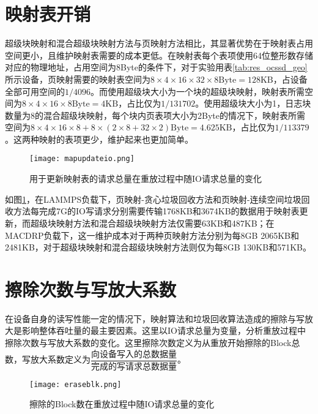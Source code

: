 \section{映射表开销}

超级块映射和混合超级块映射方法与页映射方法相比，其显著优势在于映射表占用空间更小，且维护映射表需要的成本更低。在映射表每个表项使用64位整形数存储对应的物理地址，占用空间为8Byte的条件下，对于实验用表\ref{tab:res_ocssd_geo}所示设备，页映射需要的映射表空间为$8\times 4\times 16\times 32\times 8\mathrm{Byte}=128\mathrm{KB}$，占设备全部可用空间的$1/4096$。而使用超级块大小为一个块的超级块映射，映射表所需空间为$8\times 4\times 16\times 8\mathrm{Byte}=4\mathrm{KB}$，占比仅为$1/131702$。使用超级块大小为1，日志块数量为8的混合超级块映射，每个块内页表项大小为2Byte的情况下，映射表所需空间为$8\times 4\times 16\times 8 + 8\times (2\times 8 + 32\times 2)\mathrm{Byte} = 4.625\mathrm{KB}$，占比仅为$1/113379$。这两种映射的表项更少，维护起来也更加简单。

\begin{figure}[H]
    \centering
    \texttt{[image: mapupdateio.png]}
    \caption{用于更新映射表的请求总量在重放过程中随IO请求总量的变化}
    \label{fig:res_mapupdate}
\end{figure}

如图\ref{fig:res_mapupdate}，在LAMMPS负载下，页映射-贪心垃圾回收方法和页映射-连续空间垃圾回收方法每完成7G的IO写请求分别需要传输1768KB和3674KB的数据用于映射表更新，而超级块映射方法和混合超级块映射方法仅需要63KB和487KB；在MACDRP负载下，这一维护成本对于两种页映射方法分别为每8GB 2065KB和2481KB，对于超级块映射和混合超级块映射方法则仅为每8GB 130KB和571KB。

\section{擦除次数与写放大系数}

在设备自身的读写性能一定的情况下，映射算法和垃圾回收算法造成的擦除与写放大是影响整体吞吐量的最主要因素。这里以IO请求总量为变量，分析重放过程中擦除次数与写放大系数的变化。这里擦除次数定义为从重放开始擦除的Block总数，写放大系数定义为$\dfrac{\text{向设备写入的总数据量}}{\text{完成的写请求总数据量}}$。

\begin{figure}[H]
    \centering
    \texttt{[image: eraseblk.png]}
    \caption{擦除的Block数在重放过程中随IO请求总量的变化}
    \label{fig:res_erasecount}
\end{figure}

